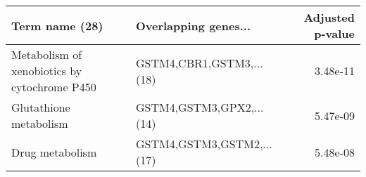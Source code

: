\begin{tabular}{llr}
\toprule
                              Term name (28) &      Overlapping genes... &  Adjusted p-value \\
\midrule
Metabolism of xenobiotics by cytochrome P450 &  GSTM4,CBR1,GSTM3,...(18) &          3.48e-11 \\
                      Glutathione metabolism &  GSTM4,GSTM3,GPX2,...(14) &          5.47e-09 \\
                             Drug metabolism & GSTM4,GSTM3,GSTM2,...(17) &          5.48e-08 \\
\bottomrule
\end{tabular}
